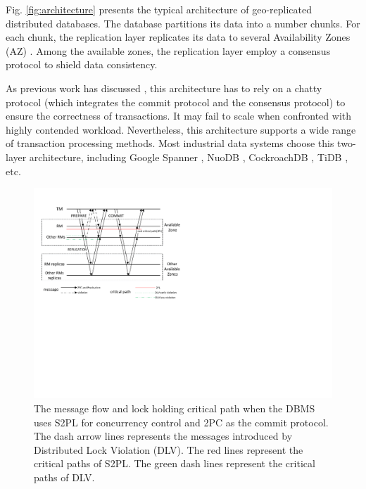 \documentclass[conference]{IEEEtran}
\begin{document}
Fig.    \ref{fig:architecture} presents the typical architecture of geo-replicated distributed databases.
The database partitions its data into a number chunks.
For each chunk, the replication layer replicates its data to several Availability Zones (AZ) \cite{Aurora:conf/sigmod/VerbitskiGSCGBM18}.
Among the available zones, the replication layer employ a consensus protocol to shield data consistency.

As previous work has discussed \cite{Calvin:conf/sigmod/ThomsonDWRSA12}\cite{Tapir:conf/sosp/ZhangSSKP15}\cite{Janus:conf/osdi/MuNLL16},
this architecture has to rely on a chatty protocol (which integrates the commit protocol and the consensus protocol) to ensure the correctness of transactions.
It may fail to scale when confronted with highly contended workload.
Nevertheless, this architecture supports a wide range of transaction processing methods.
Most industrial data systems choose this two-layer architecture, including Google Spanner \cite{Spanner:conf/osdi/CorbettDEFFFGGHHHKKLLMMNQRRSSTWW12}\cite{Spanner:conf/sigmod/BaconBBCDFFGJKL17},
NuoDB \cite{NuoDB}, CockroachDB \cite{CockroachDB}, TiDB \cite{TiDB}, etc.

\begin{figure}[htbp]
  \centerline{\includegraphics[scale=0.62]{figure/message_flow.pdf}}
  \caption{The message flow and lock holding critical path when the DBMS uses S2PL for concurrency control and 2PC as the commit protocol.
The dash arrow lines represents the messages introduced by Distributed Lock Violation (DLV). The red lines represent the critical paths of S2PL.
The green dash lines represent the critical paths of DLV.}
  \label{fig:two_layers_architecture}
\end{figure}
\end{document}
